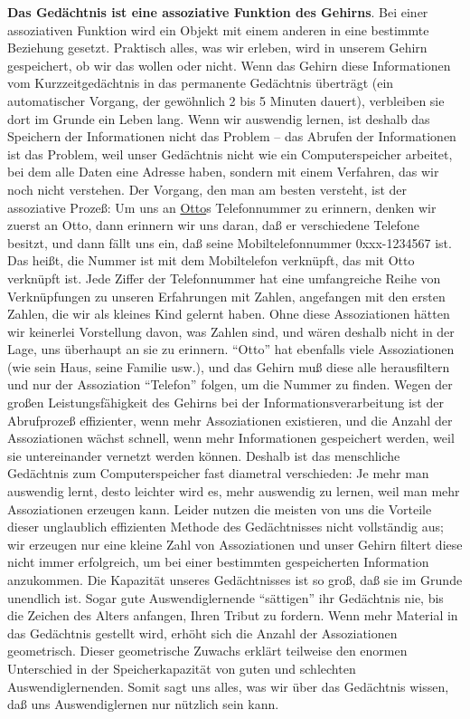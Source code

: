 \textbf{Das Gedächtnis ist eine assoziative Funktion des Gehirns}.
Bei einer assoziativen Funktion wird ein Objekt mit einem anderen in eine bestimmte Beziehung gesetzt.
Praktisch alles, was wir erleben, wird in unserem Gehirn gespeichert, ob wir das wollen oder nicht.
Wenn das Gehirn diese Informationen vom Kurzzeitgedächtnis in das permanente Gedächtnis überträgt (ein automatischer Vorgang, der gewöhnlich 2 bis 5 Minuten dauert), verbleiben sie dort im Grunde ein Leben lang.
Wenn wir auswendig lernen, ist deshalb das Speichern der Informationen nicht das Problem -- das Abrufen der Informationen ist das Problem, weil unser Gedächtnis nicht wie ein Computerspeicher arbeitet, bei dem alle Daten eine Adresse haben, sondern mit einem Verfahren, das wir noch nicht verstehen.
Der Vorgang, den man am besten versteht, ist der assoziative Prozeß: Um uns an \hyperref[johndoe]{Otto}s Telefonnummer zu erinnern, denken wir zuerst an Otto, dann erinnern wir uns daran, daß er verschiedene Telefone besitzt, und dann fällt uns ein, daß seine Mobiltelefonnummer 0xxx-1234567 ist.
Das heißt, die Nummer ist mit dem Mobiltelefon verknüpft, das mit Otto verknüpft ist.
Jede Ziffer der Telefonnummer hat eine umfangreiche Reihe von Verknüpfungen zu unseren Erfahrungen mit Zahlen, angefangen mit den ersten Zahlen, die wir als kleines Kind gelernt haben.
Ohne diese Assoziationen hätten wir keinerlei Vorstellung davon, was Zahlen sind, und wären deshalb nicht in der Lage, uns überhaupt an sie zu erinnern.
\enquote{Otto} hat ebenfalls viele Assoziationen (wie sein Haus, seine Familie usw.), und das Gehirn muß diese alle herausfiltern und nur der Assoziation \enquote{Telefon} folgen, um die Nummer zu finden.
Wegen der großen Leistungsfähigkeit des Gehirns bei der Informationsverarbeitung ist der Abrufprozeß effizienter, wenn mehr Assoziationen existieren, und die Anzahl der Assoziationen wächst schnell, wenn mehr Informationen gespeichert werden, weil sie untereinander vernetzt werden können.
Deshalb ist das menschliche Gedächtnis zum Computerspeicher fast diametral verschieden: Je mehr man auswendig lernt, desto leichter wird es, mehr auswendig zu lernen, weil man mehr Assoziationen erzeugen kann.
Leider nutzen die meisten von uns die Vorteile dieser unglaublich effizienten Methode des Gedächtnisses nicht vollständig aus; wir erzeugen nur eine kleine Zahl von Assoziationen und unser Gehirn filtert diese nicht immer erfolgreich, um bei einer bestimmten gespeicherten Information anzukommen.
Die Kapazität unseres Gedächtnisses ist so groß, daß sie im Grunde unendlich ist.
Sogar gute Auswendiglernende \enquote{sättigen} ihr Gedächtnis nie, bis die Zeichen des Alters anfangen, Ihren Tribut zu fordern.
Wenn mehr Material in das Gedächtnis gestellt wird, erhöht sich die Anzahl der Assoziationen geometrisch.
Dieser geometrische Zuwachs erklärt teilweise den enormen Unterschied in der Speicherkapazität von guten und schlechten Auswendiglernenden.
Somit sagt uns alles, was wir über das Gedächtnis wissen, daß uns Auswendiglernen nur nützlich sein kann.


